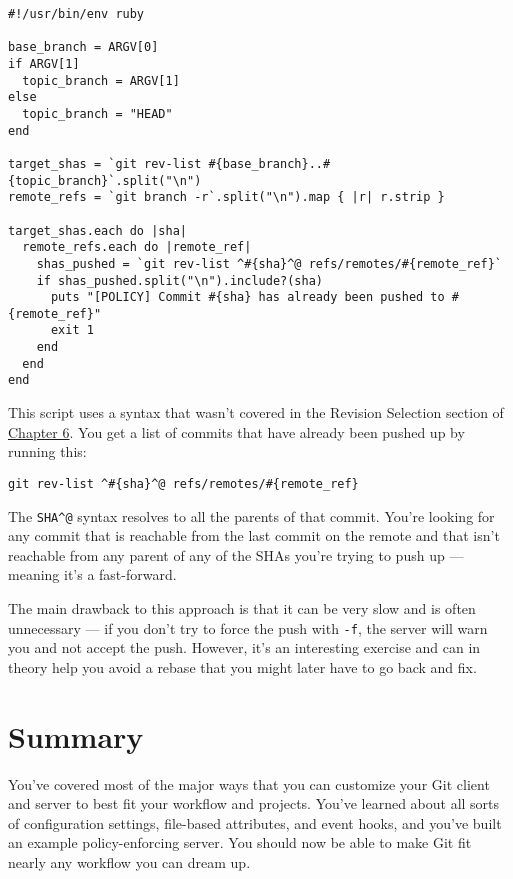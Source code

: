 \documentclass[a4paper]{book}
\newcommand{\prechap}{Chapter }
\newcommand{\postchap}{}
\newcommand{\chapref}[1]{\hyperref[chap:#1]{\prechap #1\postchap}}
\begin{document}
\begin{shaded}\begin{verbatim}
#!/usr/bin/env ruby

base_branch = ARGV[0]
if ARGV[1]
  topic_branch = ARGV[1]
else
  topic_branch = "HEAD"
end

target_shas = `git rev-list #{base_branch}..#{topic_branch}`.split("\n")
remote_refs = `git branch -r`.split("\n").map { |r| r.strip }

target_shas.each do |sha|
  remote_refs.each do |remote_ref|
    shas_pushed = `git rev-list ^#{sha}^@ refs/remotes/#{remote_ref}`
    if shas_pushed.split("\n").include?(sha)
      puts "[POLICY] Commit #{sha} has already been pushed to #{remote_ref}"
      exit 1
    end
  end
end
\end{verbatim}\end{shaded}

This script uses a syntax that wasn't covered in the Revision Selection section of \chapref{6}. You get a list of commits that have already been pushed up by running this:

\begin{shaded}\begin{verbatim}
git rev-list ^#{sha}^@ refs/remotes/#{remote_ref}
\end{verbatim}\end{shaded}

The \texttt{SHA\^{}@} syntax resolves to all the parents of that commit. You're looking for any commit that is reachable from the last commit on the remote and that isn't reachable from any parent of any of the SHAs you're trying to push up --- meaning it's a fast-forward.

The main drawback to this approach is that it can be very slow and is often unnecessary --- if you don't try to force the push with \texttt{-f}, the server will warn you and not accept the push. However, it's an interesting exercise and can in theory help you avoid a rebase that you might later have to go back and fix.

\section{Summary}\label{summary-7}

You've covered most of the major ways that you can customize your Git client and server to best fit your workflow and projects. You've learned about all sorts of configuration settings, file-based attributes, and event hooks, and you've built an example policy-enforcing server. You should now be able to make Git fit nearly any workflow you can dream up.
\end{document}

